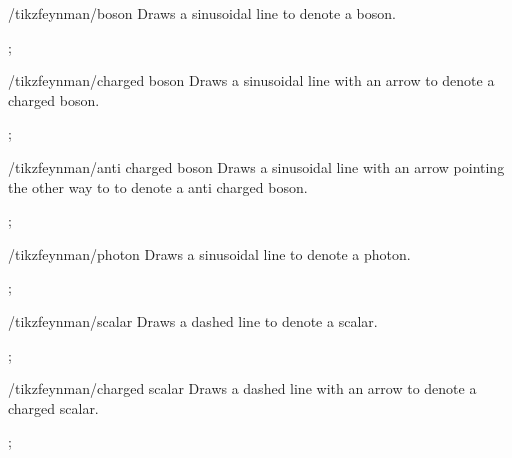 \documentclass[a4paper,final]{ltxdoc}
\begin{document}
\begin{key}{/tikzfeynman/boson}
  Draws a sinusoidal line to denote a boson.

\begin{codeexample}[]
;
\end{codeexample}
\end{key}

\begin{key}{/tikzfeynman/charged boson}
  Draws a sinusoidal line with an arrow to denote a charged boson.

\begin{codeexample}[]
;
\end{codeexample}
\end{key}

\begin{key}{/tikzfeynman/anti charged boson}
  Draws a sinusoidal line with an arrow pointing the other way to to denote a
  anti charged boson.

\begin{codeexample}[]
;
\end{codeexample}
\end{key}

\begin{key}{/tikzfeynman/photon}
  Draws a sinusoidal line to denote a photon.

\begin{codeexample}[]
;
\end{codeexample}
\end{key}

\begin{key}{/tikzfeynman/scalar}
  Draws a dashed line to denote a scalar.

\begin{codeexample}[]
;
\end{codeexample}
\end{key}

\begin{key}{/tikzfeynman/charged scalar}
  Draws a dashed line with an arrow to denote a charged scalar.

\begin{codeexample}[]
;
\end{codeexample}
\end{key}
\end{document}
